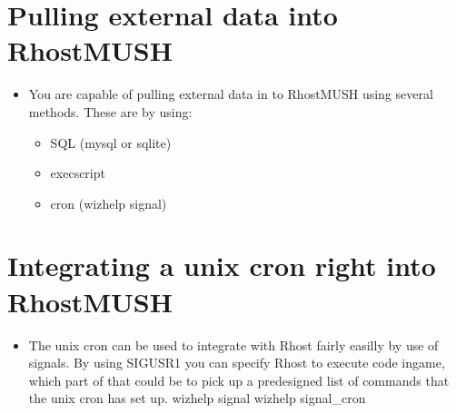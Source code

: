 \documentclass[letterpaper,10pt,english]{sphinxmanual}
\begin{document}
\section{Pulling external data into RhostMUSH}
\label{\detokenize{12-advanced:pulling-external-data-into-rhostmush}}\begin{itemize}
\item {} 
\sphinxAtStartPar
You are capable of pulling external data in to RhostMUSH using
several methods.  These are by using:
\begin{itemize}
\item {} 
\sphinxAtStartPar
SQL (mysql or sqlite)

\item {} 
\sphinxAtStartPar
execscript

\item {} 
\sphinxAtStartPar
cron (wizhelp signal)

\end{itemize}

\end{itemize}


\section{Integrating a unix cron right into RhostMUSH}
\label{\detokenize{12-advanced:integrating-a-unix-cron-right-into-rhostmush}}\begin{itemize}
\item {} 
\sphinxAtStartPar
The unix cron can be used to integrate with Rhost fairly
easilly by use of signals.  By using SIGUSR1 you can specify
Rhost to execute code in\sphinxhyphen{}game, which part of that could be
to pick up a pre\sphinxhyphen{}designed list of commands that the unix cron
has set up.
\sphinxhyphen{} wizhelp signal
\sphinxhyphen{} wizhelp signal\_cron

\end{itemize}
\end{document}
